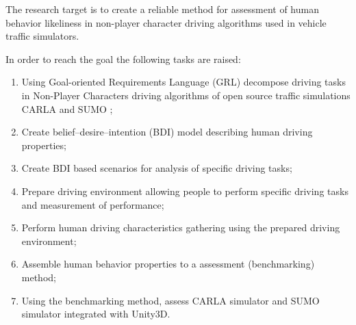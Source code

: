 \documentclass{VUMIFPS-master-intro}
\begin{document}
The research target is to create a reliable method for assessment of human behavior likeliness in non-player character driving algorithms used in vehicle traffic simulators.

In order to reach the goal the following tasks are raised:
\begin{enumerate}
	\item Using Goal-oriented Requirements Language (GRL) decompose driving tasks in Non-Player Characters driving algorithms of open source traffic simulations CARLA \cite{Dosovitskiy2017} and SUMO \cite{Biurrun2017};
	\item Create belief–desire–intention (BDI) model describing human driving properties;
	\item Create BDI based scenarios for analysis of specific driving tasks;
	\item Prepare driving environment allowing people to perform specific driving tasks and measurement of performance;
	\item Perform human driving characteristics gathering using the prepared driving environment;
	\item Assemble human behavior properties to a assessment (benchmarking) method;
	\item Using the benchmarking method, assess CARLA simulator and SUMO simulator integrated with Unity3D.
\end{enumerate}

\end{document}
